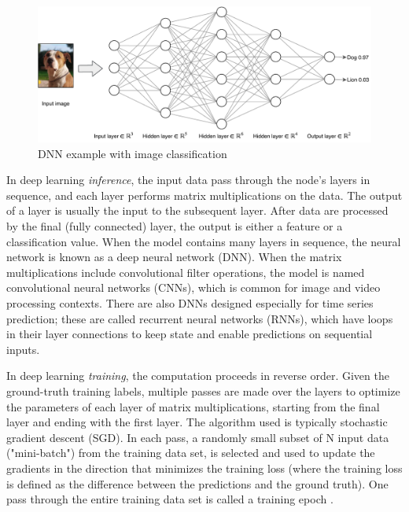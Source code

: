 \begin{figure}[tbp]
	\centering
	\includegraphics[width=0.9\linewidth]{images/nn}
	\caption[DNN example]{DNN example with image classification}
	\label{fig:dnn}
\end{figure}

In deep learning \textit{inference}, the input data pass through the node's layers in sequence, and each layer performs matrix multiplications on the data. The output of a layer is usually the input to the subsequent layer. After data are processed by the final (fully connected) layer, the output is either a feature or a classification value. When the model contains many layers in sequence, the neural network is known as a deep neural network (DNN). When the matrix multiplications include convolutional filter operations, the model is named convolutional neural networks (CNNs), which is common for image and video processing contexts. There are also DNNs designed especially for time series prediction; these are called recurrent neural networks (RNNs), which have loops in their layer connections to keep state and enable predictions on sequential inputs.

In deep learning \textit{training}, the computation proceeds in reverse order. Given the ground-truth training labels, multiple passes are made over the layers to optimize the parameters of each layer of matrix multiplications, starting from the final layer and ending with the first layer. The algorithm used is typically stochastic gradient descent (SGD).  In each pass, a randomly small subset of N input data ("mini-batch") from the training data set, is selected and used to update the gradients in the direction that minimizes the training loss (where the training loss is defined as the difference between the predictions and the ground truth). One pass through the entire training data set is called a training epoch \cite{ruder2016overview}.

